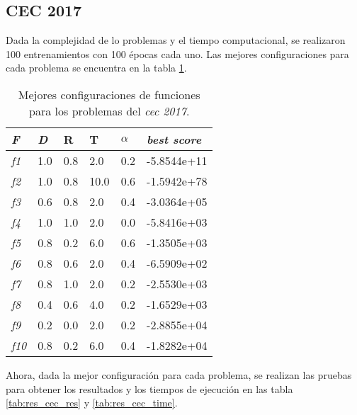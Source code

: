 \subsection{CEC 2017}

Dada la complejidad de lo problemas y el tiempo computacional, se realizaron 100 entrenamientos con 100 épocas cada uno. Las mejores configuraciones para cada problema se encuentra en la tabla \ref{tab:res_cec}.

\begin{table}[h!]
	\centering
	\begin{tabular}{|p{}| p{}| p{} |p{}|p{}| p{} |}
		\hline
		\textbf{\textit{F}}	& \textbf{\textit{D}} & \textbf{R} & \textbf{T} & \textbf{$\alpha$} & \textbf{\textit{best score}}\\ \hline
		\textit{f1} & 1.0 & 0.8 & 2.0 & 0.2 & -5.8544e+11 \\ 
		\textit{f2} & 1.0 & 0.8 & 10.0 & 0.6 & -1.5942e+78 \\ 
		\textit{f3} & 0.6 & 0.8 & 2.0 & 0.4 & -3.0364e+05 \\ 
		\textit{f4} & 1.0 & 1.0 & 2.0 & 0.0 & -5.8416e+03 \\ 
		\textit{f5} & 0.8 & 0.2 & 6.0 & 0.6 & -1.3505e+03 \\ 
		\textit{f6} & 0.8 & 0.6 & 2.0 & 0.4 & -6.5909e+02 \\ 
		\textit{f7} & 0.8 & 1.0 & 2.0 & 0.2 & -2.5530e+03 \\ 
		\textit{f8} & 0.4 & 0.6 & 4.0 & 0.2 & -1.6529e+03 \\ 
		\textit{f9} & 0.2 & 0.0 & 2.0 & 0.2 & -2.8855e+04 \\ 
		\textit{f10} & 0.8 & 0.2 & 6.0 & 0.4 & -1.8282e+04 \\ \hline
	\end{tabular}
	\caption{Mejores configuraciones de funciones para los problemas del \textit{cec 2017}.}
	\label{tab:res_cec}
\end{table}

Ahora, dada la mejor configuración para cada problema, se realizan las pruebas para obtener los resultados y los tiempos de ejecución en las tabla \ref{tab:res_cec_res} y \ref{tab:res_cec_time}.

